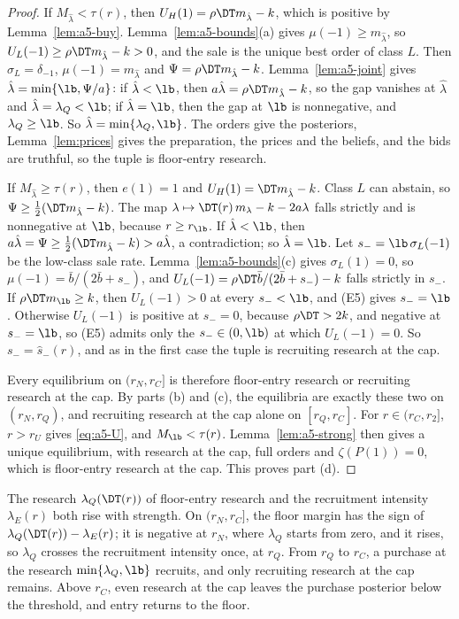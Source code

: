 \begin{proof}
If \(M_{\hat\lambda}<\tau(r)\), then \(U_H(1)=\rho\DT m_{\hat\lambda}-k\), which is positive by
Lemma~\ref{lem:a5-buy}. Lemma~\ref{lem:a5-bounds}(a) gives \(\mu(-1)\ge m_{\hat\lambda}\), so
\(U_L(-1)\ge\rho\DT m_{\hat\lambda}-k>0\), and the sale is the unique best order of class \(L\). Then
\(\sigma_L=\delta_{-1}\), \(\mu(-1)=m_{\hat\lambda}\) and \(\Psi=\rho\DT m_{\hat\lambda}-k\).
Lemma~\ref{lem:a5-joint} gives \(\hat\lambda=\min\{\lb,\Psi/a\}\): if \(\hat\lambda<\lb\), then
\(a\hat\lambda=\rho\DT m_{\hat\lambda}-k\), so the gap vanishes at \(\hat\lambda\) and \(\hat\lambda=\lambda_Q<\lb\);
if \(\hat\lambda=\lb\), then the gap at \(\lb\) is nonnegative, and \(\lambda_Q\ge\lb\). So
\(\hat\lambda=\min\{\lambda_Q,\lb\}\). The orders give the posteriors, Lemma~\ref{lem:prices} gives the preparation,
the prices and the beliefs, and the bids are truthful, so the tuple is floor-entry research.

If \(M_{\hat\lambda}\ge\tau(r)\), then \(e(1)=1\) and \(U_H(1)=\DT m_{\hat\lambda}-k\). Class \(L\) can abstain, so
\(\Psi\ge\tfrac12(\DT m_{\hat\lambda}-k)\). The map \(\lambda\mapsto\DT(r)\,m_\lambda-k-2a\lambda\) falls strictly and is
nonnegative at \(\lb\), because \(r\ge r_{\lb}\). If \(\hat\lambda<\lb\), then
\(a\hat\lambda=\Psi\ge\tfrac12(\DT m_{\hat\lambda}-k)>a\hat\lambda\), a contradiction; so \(\hat\lambda=\lb\). Let
\(s_-=\lb\,\sigma_L(-1)\) be the low-class sale rate. Lemma~\ref{lem:a5-bounds}(c) gives \(\sigma_L(1)=0\), so
\(\mu(-1)=\bar b/(2\bar b+s_-)\), and \(U_L(-1)=\rho\DT\bar b/(2\bar b+s_-)-k\) falls strictly in \(s_-\). If
\(\rho\DT m_{\lb}\ge k\), then \(U_L(-1)>0\) at every \(s_-<\lb\), and (E5) gives \(s_-=\lb\). Otherwise \(U_L(-1)\) is
positive at \(s_-=0\), because \(\rho\DT>2k\), and negative at \(s_-=\lb\), so (E5) admits only the \(s_-\in(0,\lb)\)
at which \(U_L(-1)=0\). So \(s_-=\hat s_-(r)\), and as in the first case the tuple is recruiting research at the cap.

Every equilibrium on \((r_N,r_C]\) is therefore floor-entry research or recruiting research at the cap. By parts (b)
and (c), the equilibria are exactly these two on \((r_N,r_Q)\), and recruiting research at the cap alone on
\([r_Q,r_C]\). For \(r\in(r_C,r_2]\), \(r>r_U\) gives \eqref{eq:a5-U}, and \(M_{\lb}<\tau(r)\).
Lemma~\ref{lem:a5-strong} then gives a unique equilibrium, with research at the cap, full orders and
\(\zeta(P(1))=0\), which is floor-entry research at the cap. This proves part (d).
\end{proof}

The research \(\lambda_Q(\DT(r))\) of floor-entry research and the recruitment intensity \(\lambda_E(r)\) both rise
with strength. On \((r_N,r_C]\), the floor margin has the sign of \(\lambda_Q(\DT(r))-\lambda_E(r)\); it is negative at
\(r_N\), where \(\lambda_Q\) starts from zero, and it rises, so \(\lambda_Q\) crosses the recruitment intensity once, at
\(r_Q\). From \(r_Q\) to \(r_C\), a purchase at the research \(\min\{\lambda_Q,\lb\}\) recruits, and only recruiting
research at the cap remains. Above \(r_C\), even research at the cap leaves the purchase posterior below the
threshold, and entry returns to the floor.

